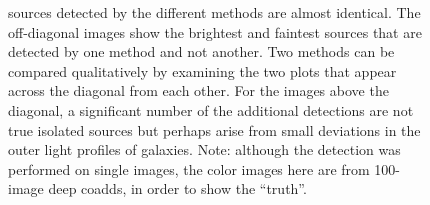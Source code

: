 \documentclass[11pt,letterpaper,linenumbers]{aastex63}
\begin{document}
\begin{figure}[p!]
{    sources detected by the different methods are almost identical.  The
    off-diagonal images show the brightest and faintest sources that are detected
    by one method and not another.  Two methods can be compared qualitatively
    by examining the two plots that appear across the diagonal from each other.
    For the images above the diagonal, a significant number of the additional
    detections are not true isolated sources but perhaps arise from small
    deviations in the outer light profiles of galaxies.
    Note: although the detection was performed on single images, the color images
    here are from 100-image deep coadds, in order to show the ``truth''.
    \label{fig:comp-images}
    }
\end{figure}


\end{document}
